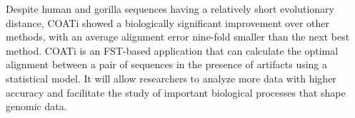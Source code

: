 Despite human and gorilla sequences having a relatively short evolutionary distance, COATi showed a biologically significant improvement over other methods, with an average alignment error nine-fold smaller than the next best method.
COATi is an FST-based application that can calculate the optimal alignment
between a pair of sequences in the presence of artifacts using a statistical
model.
It will allow researchers to analyze more data with higher accuracy and
facilitate the study of important biological processes that shape genomic data.
